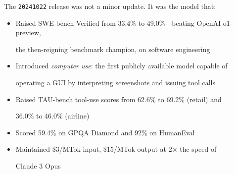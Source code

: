 The \texttt{20241022} release was not a minor update. It was the model that:











\begin{itemize}





  \item Raised SWE-bench Verified from 33.4\% to 49.0\%---beating OpenAI o1-preview,





    the then-reigning benchmark champion, on software engineering





  \item Introduced \emph{computer use}: the first publicly available model capable of





    operating a GUI by interpreting screenshots and issuing tool calls





  \item Raised TAU-bench tool-use scores from 62.6\% to 69.2\% (retail) and





    36.0\% to 46.0\% (airline)





  \item Scored 59.4\% on GPQA Diamond and 92\% on HumanEval





  \item Maintained \$3/MTok input, \$15/MTok output at 2$\times$ the speed of





    Claude 3 Opus





\end{itemize}











